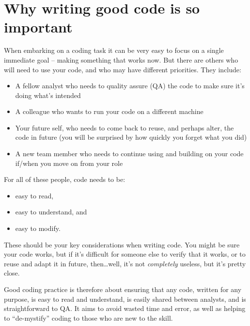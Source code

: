 \documentclass[
]{book}
\providecommand{\tightlist}{%
  \setlength{\itemsep}{0pt}\setlength{\parskip}{0pt}}
\begin{document}
\hypertarget{why-writing-good-code-is-so-important}{%
\section{Why writing good code is so important}\label{why-writing-good-code-is-so-important}}

When embarking on a coding task it can be very easy to focus on a single immediate goal -- making something that works now. But there are others who will need to use your code, and who may have different priorities. They include:

\begin{itemize}
\tightlist
\item
  A fellow analyst who needs to quality assure (QA) the code to make sure it's doing what's intended
\item
  A colleague who wants to run your code on a different machine
\item
  Your future self, who needs to come back to reuse, and perhaps alter, the code in future (you will be surprised by how quickly you forget what you did)
\item
  A new team member who needs to continue using and building on your code if/when you move on from your role
\end{itemize}

For all of these people, code needs to be:

\begin{itemize}
\tightlist
\item
  easy to read,
\item
  easy to understand, and
\item
  easy to modify.
\end{itemize}

These should be your key considerations when writing code. You might be sure your code works, but if it's difficult for someone else to verify that it works, or to reuse and adapt it in future, then\ldots well, it's not \emph{completely} useless, but it's pretty close.

Good coding practice is therefore about ensuring that any code, written for any purpose, is easy to read and understand, is easily shared between analysts, and is straightforward to QA. It aims to avoid wasted time and error, as well as helping to ``de-mystify'' coding to those who are new to the skill.
\end{document}
